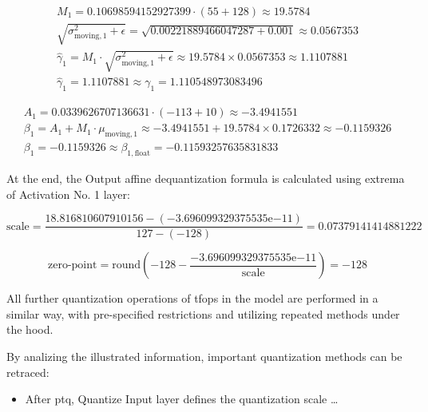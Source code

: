 {\begin{equation*}
\begin{gathered}
M_1 = 0.10698594152927399 \cdot (55 + 128) \approx 19.5784 \\
\sqrt{\sigma^2_{\text{moving},1} + \epsilon} = \sqrt{0.00221889466047287 + 0.001} \approx 0.0567353 \\
\hat{\gamma}_1 = M_1 \cdot \sqrt{\sigma^2_{\text{moving},1} + \epsilon} \approx 19.5784 \times 0.0567353 \approx 1.1107881 \\
\hat{\gamma}_1 = 1.1107881 \approx \gamma_1 = 1.110548973083496
\end{gathered}
\end{equation*}


\begin{equation*}
\begin{gathered}
A_1 = 0.0339626707136631 \cdot (-113 + 10) \approx -3.4941551 \\
\beta_1 = A_1 + M_1 \cdot \mu_{\text{moving},1} \approx -3.4941551 + 19.5784 \times 0.1726332 \approx -0.1159326 \\
\beta_1 = -0.1159326 \approx \beta_{1,\text{float}} = -0.11593257635831833
\end{gathered}
\end{equation*}

At the end, the Output affine dequantization formula is calculated using extrema of Activation No. 1 layer:

\begin{equation*}
\text{scale} = \frac{18.816810607910156 - (-3.696099329375535 \mathrm{e}{-11})}{127 - (-128)} = 0.07379141414881222
\end{equation*}

\begin{equation*}
\text{zero-point} = \text{round}\left( -128 - \frac{-3.696099329375535 \mathrm{e}{-11}}{\text{scale}} \right) = -128
\end{equation*}

All further quantization operations of \glspl{tfop} in the model are performed in a similar way,
with pre-specified restrictions and utilizing repeated methods under the hood.

By analizing the illustrated information, important quantization methods can be retraced:
\begin{itemize}
  \item After \gls{ptq}, Quantize Input layer defines the quantization scale \dots
\end{itemize}

}
